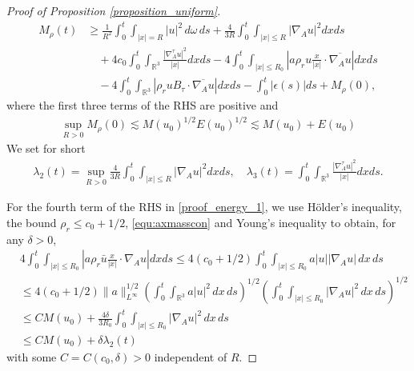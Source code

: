 \documentclass[10pt%
]{amsart}
\numberwithin{equation}{section}
\newcommand{\R}{\mathbb{R}}
\theoremstyle{definition}
\begin{document}
\begin{proof}[Proof of Proposition \ref{proposition_uniform}]
	\begin{align}\label{proof_energy_1}
		M_\rho(t)
		& \ge \frac{1}{R^2}\int_0^t\int_{|x|=R}|u|^2\,d\omega\,ds
		+\frac{4}{3R}\int_0^t\int_{|x|\le R}|{\nabla_A u}|^2dx ds\\
		\nonumber
		&\quad +4c_0\int_0^t\int_{\R^3}\frac{|\nabla_A^\tau u|^2}{|x|}dx ds 
		-4\int_0^t\int_{|x|\le R_0}|a\rho_ru\frac{x}{|x|}\cdot\overline{\nabla_A u}|dx ds\\
		\nonumber
		&\quad -4\int_0^t\int_{\R^3}|\rho_ruB_\tau \cdot \overline{\nabla_A u}|dx ds
		-\int_0^t |\epsilon(s)|ds+M_\rho(0),
	\end{align}
	where the first three terms of the RHS are positive and 
	\begin{align}
		\label{proof_energy_2}
		\sup_{R>0}M_\rho(0)\lesssim M(u_0)^{1/2}E(u_0)^{1/2}\lesssim M(u_0)+E(u_0)
	\end{align}
	We set for short
	\begin{align*}
		\lambda_2(t)=\sup_{R>0}\frac{4}{3R}\int_0^t\int_{|x|\le R}|{\nabla_A u}|^2dx ds,\quad\lambda_3(t)=\int_0^t\int_{\R^3}\frac{|\nabla_A^\tau u|^2}{|x|}dx ds.
	\end{align*}
	
	For the fourth term of the RHS in \eqref{proof_energy_1}, we use H\"older's inequality, the bound $\rho_r\le c_0+1/2$, \eqref{equ:axmasscon} and Young's inequality to obtain, for any $\delta>0$, 
	\begin{align}
		\label{proof_energy_3}
		&4\int_0^t\int_{|x|\le R_0}|a\rho_r\bar{u}\frac{x}{|x|}\cdot\nabla_A u|dx ds
		\le 4(c_0+1/2)\int_0^t\int_{|x|\le R_0}a|u||\nabla_Au|\,dx\,ds\\\nonumber
		& \le4(c_0+1/2)\|a\|_{L^\infty}^{1/2} \left(\int_0^t\int_{\R^3}a|u|^2\,dx\,ds\right)^{1/2}\left(\int_0^t\int_{|x|\le R_0}|\nabla_Au|^2\,dx\,ds\right)^{1/2}\\\nonumber
		&\le C M(u_0)+\frac{4\delta}{3R_0}\int_0^t\int_{|x|\le R_0}|\nabla_Au|^2\,dx\,ds\\\nonumber
		&\le C M(u_0)+ \delta \lambda_2(t)
	\end{align}
	with some $C=C(c_0,\delta)>0$ independent of $R$. 
	

\end{proof}
\end{document}

